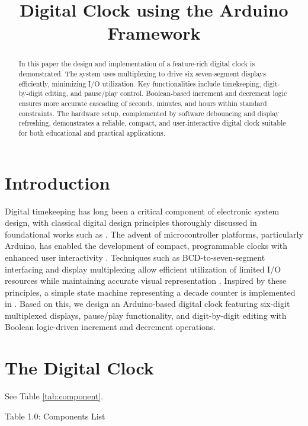 \documentclass[conference]{IEEEtran}
\title{Digital Clock using the Arduino Framework}
\author{
    \IEEEauthorblockN{Dhawal Saini and G. V. V. Sharma}
    \IEEEauthorblockA{Department of Electrical Engineering\\
    Indian Institute of Technology Hyderabad\\
    Email: gadepall@ee.iith.ac.in}
}
\begin{document}
\maketitle

\begin{abstract}
In this paper the design and implementation of a feature-rich digital clock is demonstrated. The system uses multiplexing to drive six seven-segment displays efficiently, minimizing I/O utilization. Key functionalities include timekeeping, digit-by-digit editing, and pause/play control. Boolean-based increment and decrement logic ensures more accurate cascading of seconds, minutes, and hours within standard constraints. The hardware setup, complemented by software debouncing and display refreshing, demonstrates a reliable, compact, and user-interactive digital clock suitable for both educational and practical applications.
\end{abstract}
\section{Introduction}
Digital timekeeping has long been a critical component of electronic system design, with classical digital design principles thoroughly discussed in foundational works such as \cite{mano2013digital, malvino2017digital, patterson2014computer}. The advent of microcontroller platforms, particularly Arduino, has enabled the development of compact, programmable clocks with enhanced user interactivity \cite{arduino_reference}. Techniques such as BCD-to-seven-segment interfacing and display multiplexing allow efficient utilization of limited I/O resources while maintaining accurate visual representation \cite{ti7447datasheet}. Inspired by these principles, a simple state machine representing a decade counter is  implemented in \cite{ddta}.  Based 
on this, 
we design an Arduino-based digital clock featuring six-digit multiplexed displays, pause/play functionality, and digit-by-digit editing with Boolean logic-driven increment and decrement operations.

%
%
\section{The Digital Clock}
See 
Table \ref{tab:component}.
\begin{table}[!h]
\centering

\caption{Table 1.0: Components List}
\label{tab:component}
\end{table}













\end{document}
